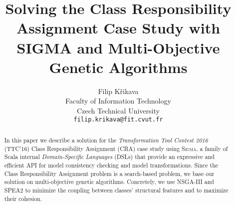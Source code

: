 \documentclass[a4paper]{article}
\title{Solving the \TTC Class Responsibility Assignment Case Study with SIGMA and Multi-Objective Genetic Algorithms}
\author{Filip Křikava\\ Faculty of Information Technology\\ Czech Technical University\\ \texttt{filip.krikava@fit.cvut.fr}}
\newcommand{\SIGMA}{\textsc{Sigma}\xspace}
\newcommand{\TTC}{TTC'16\xspace}
\begin{document}
\maketitle

\begin{abstract}
In this paper we describe a solution for the \emph{Transformation Tool Contest 2016} (\TTC) Class Responsibility Assignment (CRA) case study using \SIGMA, a family of Scala internal \emph{Domain-Specific Languages} (DSLs) that provide an expressive and efficient API for model consistency checking and model transformations.
Since the Class Responsibility Assignment problem is a search-based problem, we base our solution on multi-objective genetic algorithms.
Concretely, we use NSGA-III and SPEA2 to minimize the coupling between classes' structural features and to maximize their cohesion.
\end{abstract}









\appendix


\end{document}
